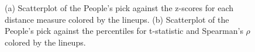 \documentclass[12]{report}
\begin{document}
\begin{figure}[htbp]
\centering
{}
\label{dist_z_perc}
	\vspace{-.1in}
\caption[Optional caption for list of figures]{(a) Scatterplot of the People's pick against the z-scores for each distance measure colored by the lineups. (b) Scatterplot of the People's pick against the percentiles for t-statistic and Spearman's $\rho$ colored by the lineups. }
\end{figure}


     
        
% 
\end{document}
